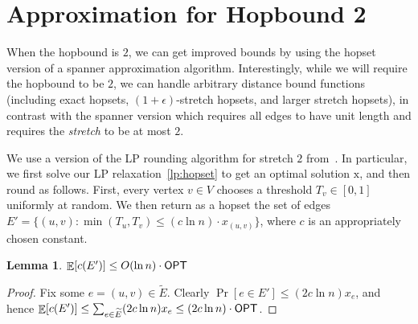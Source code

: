 \documentclass{article}
\newtheorem{lemma}[theorem]{Lemma}
\theoremstyle{definition}
\theoremstyle{remark}
\DeclareMathOperator*{\E}{\mathbb{E}}
\def\opt {{\sf OPT}}
\begin{document}
 



\iflong
\section{Approximation for Hopbound 2} \label{sec:2hop}
When the hopbound is $2$, we can get improved bounds by using the hopset version of a spanner approximation algorithm.  Interestingly, while we will require the hopbound to be $2$, we can handle arbitrary distance bound functions (including exact hopsets, $(1+\epsilon)$-stretch hopsets, and larger stretch hopsets), in contrast with the spanner version which requires all edges to have unit length and requires the \emph{stretch} to be at most $2$.

 
We use a version of the LP rounding algorithm for stretch $2$ from~\cite{DK11}.  In particular, we first solve our LP relaxation~\eqref{lp:hopset} to get an optimal solution $\bm{\mathrm{x}}$, and then round as follows.  First, every vertex $v \in V$ chooses a threshold $T_v \in [0,1]$ uniformly at random.  We then return as a hopset the set of edges $E' = \{(u,v) : \min(T_u, T_v) \leq (c \ln n) \cdot x_{(u,v)} \}$, where $c$ is an appropriately chosen constant. 

\begin{lemma} \label{lem:2hop-cost}
$\E[c(E')] \leq O(\ln n) \cdot \opt$
\end{lemma}
\begin{proof}
    Fix some $e = (u,v) \in \widetilde{E}$. 
    Clearly $\Pr[e \in E'] \leq (2c\ln n) x_e$, and hence $\E[c(E')] \leq \sum_{e \in \widetilde{E}} (2c\ln n) x_e \leq (2c \ln n) \cdot \opt$.
\end{proof}
\end{document}
